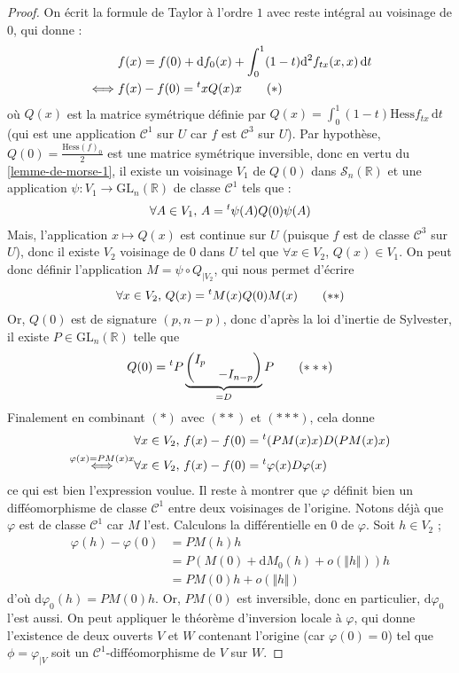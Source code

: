   \begin{proof}
    On écrit la formule de Taylor à l'ordre $1$ avec reste intégral au voisinage de $0$, qui donne :
    \begin{align*}
      &f(x) = f(0) + \mathrm{d} f_0(x) + \int_0^1 (1-t) \mathrm{d}^2 f_{tx} (x, x) \, \mathrm{d}t \\
      \iff& f(x) - f(0) = \mathstrut ^t x Q(x) x \tag{$*$}
    \end{align*}
    où $Q(x)$ est la matrice symétrique définie par $Q(x) = \int_0^1 (1-t) \mathrm{Hess} f_{tx} \, \mathrm{d}t$ (qui est une application $\mathcal{C}^1$ sur $U$ car $f$ est $\mathcal{C}^3$ sur $U$).
    \newpar
    Par hypothèse, $Q(0) = \frac{\mathrm{Hess} (f)_0}{2}$ est une matrice symétrique inversible, donc en vertu du \cref{lemme-de-morse-1}, il existe un voisinage $V_1$ de $Q(0)$ dans $\mathcal{S}_n(\mathbb{R})$ et une application $\psi : V_1 \rightarrow \mathrm{GL}_n(\mathbb{R})$ de classe $\mathcal{C}^1$ tels que :
    \[ \forall A \in V_1, \, A = \mathstrut ^t \psi(A) Q(0) \psi(A) \]
    Mais, l'application $x \mapsto Q(x)$ est continue sur $U$ (puisque $f$ est de classe $\mathcal{C}^3$ sur $U$), donc il existe $V_2$ voisinage de $0$ dans $U$ tel que $\forall x \in V_2$, $Q(x) \in V_1$. On peut donc définir l'application $M = \psi \circ Q_{|V_2}$, qui nous permet d'écrire
    \[ \forall x \in V_2, \, Q(x) = \mathstrut ^t M (x) Q(0) M (x) \tag{$**$} \]
    Or, $Q(0)$ est de signature $(p, n-p)$, donc d'après la loi d'inertie de Sylvester, il existe $P \in \mathrm{GL}_n(\mathbb{R})$ telle que
    \[ Q(0) = \mathstrut ^t P \underbrace{\begin{pmatrix} I_p & \\ & - I_{n-p} \end{pmatrix}}_{= D} P \tag{$***$} \]
    Finalement en combinant $(*)$ avec $(**)$ et $(***)$, cela donne
    \begin{align*}
      &\forall x \in V_2, \, f(x) - f(0) = \mathstrut ^t (P M(x) x) D (P M(x) x) \\
      \overset{\varphi(x) = P M(x) x}{\iff}& \forall x \in V_2, \, f(x) - f(0) = \mathstrut ^t \varphi(x) D \varphi(x)
    \end{align*}
    ce qui est bien l'expression voulue.
    \newpar
    Il reste à montrer que $\varphi$ définit bien un difféomorphisme de classe $\mathcal{C}^1$ entre deux voisinages de l'origine. Notons déjà que $\varphi$ est de classe $\mathcal{C}^1$ car $M$ l'est. Calculons la différentielle en $0$ de $\varphi$. Soit $h \in V_2$ ;
    \begin{align*}
      \varphi(h) - \varphi(0) &= P M(h) h \\
      &= P( M(0) + \mathrm{d} M_0 (h) + o(\Vert h \Vert))h \\
      &= P M(0) h + o(\Vert h \Vert)
    \end{align*}
    d'où $\mathrm{d} \varphi_0 (h) = P M(0) h$. Or, $P M(0)$ est inversible, donc en particulier, $\mathrm{d} \varphi_0$ l'est aussi. On peut appliquer le théorème d'inversion locale à $\varphi$, qui donne l'existence de deux ouverts $V$ et $W$ contenant l'origine (car $\varphi(0) = 0$) tel que $\phi = \varphi_{|V}$ soit un $\mathcal{C}^1$-difféomorphisme de $V$ sur $W$.
  \end{proof}

